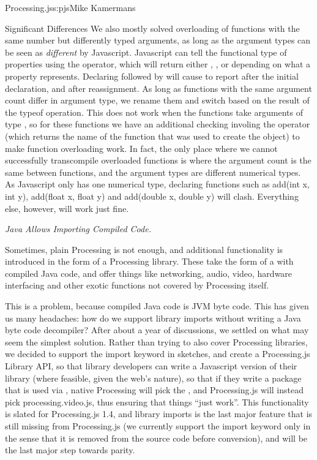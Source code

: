 \begin{aosachapter}{Processing.js}{s:pjs}{Mike Kamermans}
\begin{aosasect1}{Significant Differences}
We also mostly solved overloading of functions with the same number
but differently typed arguments, as long as the argument types can be
seen as \emph{different} by Javascript. Javascript can tell the functional
type of properties using the  operator, which will return
either , ,  or  depending on what a
property represents. Declaring  followed by  will
cause  to report  after the initial declaration, and
 after reassignment. As long as functions with the same
argument count differ in argument type, we rename them and switch
based on the result of the typeof operation. This does not work when
the functions take arguments of type , so for these functions
we have an additional checking involing the  operator
(which returns the name of the function that was used to create the
object) to make function overloading work. In fact, the only place
where we cannot successfully transcompile overloaded functions is
where the argument count is the same between functions, and the
argument types are different numerical types. As Javascript only has
one numerical type, declaring functions such as add(int x, int y),
add(float x, float y) and add(double x, double y) will
clash. Everything else, however, will work just fine.

\emph{Java Allows Importing Compiled Code.}

Sometimes, plain Processing is not enough, and additional
functionality is introduced in the form of a Processing library. These
take the form of a  with compiled Java code, and offer
things like networking, audio, video, hardware interfacing and other
exotic functions not covered by Processing itself.

This is a problem, because compiled Java code is JVM byte code. This
has given us many headaches: how do we support library imports without
writing a Java byte code decompiler? After about a year of
discussions, we settled on what may seem the simplest solution. Rather
than trying to also cover Processing libraries, we decided to support
the import keyword in sketches, and create a Processing.js Library
API, so that library developers can write a Javascript version of
their library (where feasible, given the web's nature), so that if
they write a package that is used via ,
native Processing will pick the , and Processing.js
will instead pick processing.video.js, thus ensuring that things
``just work''. This functionality is slated for Processing.js 1.4, and
library imports is the last major feature that is still missing from
Processing.js (we currently support the import keyword only in the
sense that it is removed from the source code before conversion), and
will be the last major step towards parity.


\end{aosasect1}
\end{aosachapter}
